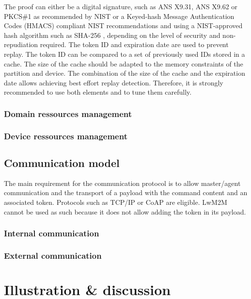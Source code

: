 \documentclass[conference]{IEEEtran}
\begin{document}
The proof can either be a digital signature, such as ANS X9.31, ANS X9.62 or PKCS\#1 as recommended by NIST \cite{nist_dss_2013} or a Keyed-hash Message Authentication Codes (HMACS) compliant NIST recommendations and using a NIST-approved hash algorithm such as SHA-256 \cite{nist_hmac_2008, nist_hash_2012}, depending on the level of security and non-repudiation required.
The token ID and expiration date are used to prevent replay. The token ID can be compared to a set of previously used IDs stored in a cache. The size of the cache should be adapted to the memory constraints of the partition and device. The combination of the size of the cache and the expiration date allows achieving best effort replay detection. Therefore, it is strongly recommended to use both elements and to tune them carefully. 

\subsubsection{Domain ressources management}
\subsubsection{Device ressources management}

\subsection{Communication model}
\label{sec:Communication_model}
The main requirement for the communication protocol is to allow master/agent communication and the transport of a payload with the command content and an associated token. Protocols such as TCP/IP or CoAP are eligible. LwM2M \cite{oma_lwm2M_2017} cannot be used as such because it does not allow adding the token in its payload.

\subsubsection{Internal communication}

\subsubsection{External communication}


\section{Illustration \& discussion}
\end{document}
